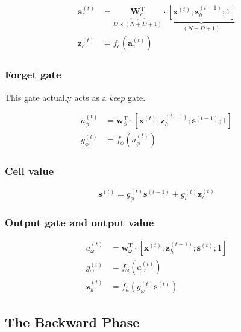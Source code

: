 \documentclass[11pt]{article}
\begin{document}
\begin{align}
  \mathbf{a}_{c}^{(t)}
  & = \underbrace{\mathbf{W}_{c}^{\text{T}}}_{D \times (N+D+1)}
    \cdot \underbrace{\left[\mathbf{x}^{(t)}; \mathbf{z}_{h}^{(t-1)};
    1\right]}_{(N+D+1)} \\
  \mathbf{z}_{c}^{(t)}
  & = f_{c}\left(\mathbf{a}_{c}^{(t)}\right)
\end{align}

\subsubsection*{Forget gate}

This gate actually acts as a \emph{keep} gate.

\begin{align}
  a_{\phi}^{(t)}
  & = \mathbf{w}_{\phi}^{\text{T}} \cdot
    \left[\mathbf{x}^{(t)}; \mathbf{z}_{h}^{(t-1)}; \mathbf{s}^{(t-1)};
    1\right] \\
  g_{\phi}^{(t)}
  & = f_{\phi}\left(a_{\phi}^{(t)}\right)
\end{align}

\subsubsection*{Cell value}

\begin{equation}
  \mathbf{s}^{(t)} =
  g_{\phi}^{(t)} \mathbf{s}^{(t-1)} + g_{\iota}^{(t)} \mathbf{z}_{c}^{(t)}
\end{equation}

\subsubsection*{Output gate and output value}

\begin{align}
  a_{\omega}^{(t)}
  & = \mathbf{w}_{\omega}^{\text{T}} \cdot
    \left[\mathbf{x}^{(t)}; \mathbf{z}_{h}^{(t-1)}; \mathbf{s}^{(t)};
    1\right] \\
  g_{\omega}^{(t)} & = f_{\omega}\left(a_{\omega}^{(t)}\right) \\
  \mathbf{z}_h^{(t)} & = f_h\left(g_{\omega}^{(t)} \mathbf{s}^{(t)}\right)
\end{align}

\subsection{The Backward Phase}
\end{document}
